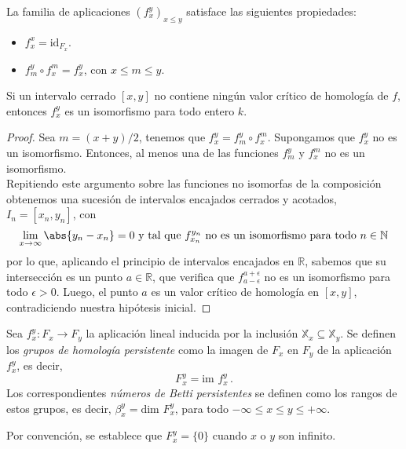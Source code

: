 \begin{property}
La familia de aplicaciones $(f_{x}^{y})_{x \leq y}$ satisface las siguientes propiedades:
\begin{itemize}
	\item $f_{x}^{x}= \text{id}_{F_x}$.
	\item $f_{m}^{y} \circ f_{x}^{m} = f_{x}^{y}$, con $x \leq m \leq y$.
\end{itemize}
\end{property}


\begin{lemma}
\label{ref:lemaValCritico}
Si un intervalo cerrado $[x, y]$ no contiene ningún valor crítico de homología de $f$, entonces $f_{x}^{y}$ es un isomorfismo para todo entero $k$.
\end{lemma}

\begin{proof}
Sea $m = (x+y)/2$, tenemos que $f_{x}^{y}=f_{m}^{y} \circ f_{x}^{m}$. Supongamos que $f_{x}^{y}$ no es un isomorfismo. Entonces, al menos una de las funciones $f_{m}^{y}$ y $f_{x}^{m}$ no es un isomorfismo.\\
Repitiendo este argumento sobre las funciones no isomorfas de la composición obtenemos una sucesión de intervalos encajados cerrados y acotados, $I_n=[x_n,y_n]$, con
\[
\lim_{x\to\infty} \abs{y_n - x_n} = 0 \text{ y tal que } f_{x_n}^{y_n} \text{ no es un isomorfismo para todo  } n \in \mathbb{N}
\]
por lo que, aplicando el principio de intervalos encajados en $\mathbb{R}$, sabemos que su intersección es un punto $a \in \mathbb{R}$, que verifica que $f_{a-\epsilon}^{a+\epsilon}$ no es un isomorfismo para todo $\epsilon > 0$. Luego, el punto $a$ es un valor crítico de homología en $[x, y]$, contradiciendo nuestra hipótesis inicial.
\end{proof}

\begin{definition}
Sea ${f_{x}^{y}: F_x \to F_y}$ la aplicación lineal inducida por la inclusión $\mathbb{X}_{x} \subseteq \mathbb{X}_{y}$. Se definen los \emph{grupos de homología persistente} como la imagen de $F_x$ en $F_y$ de la aplicación $f_{x}^{y}$, es decir,
\[
F_{x}^{y} = \text{im } f_{x}^{y}\,.
\]
Los correspondientes \emph{números de Betti persistentes} se definen como los rangos de estos grupos, es decir, $\beta_{x}^{y} = \text{dim } F_{x}^{y}$, para todo $-\infty \leq x \leq y \leq + \infty$. 
\end{definition}
Por convención, se establece que $F_{x}^{y}= \{0\}$ cuando $x$ o $y$ son infinito. 


